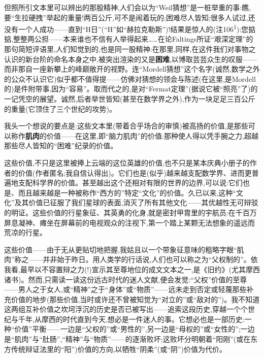 \dmark{}但照所引文本里可以辨出的那股精神,人们会以为“Weil猜想”是一桩举重的事:瞧,要“生拉硬拽”举起的重量!两百公斤,可不是闹着玩的;困难尽人皆知;很多人试过,还没有一个人成功——直到“H日”(“H”如“赫拉克勒斯”)!结果是惊人的(注106\textsuperscript{1}):您掂掂,整整两公担——本来谁也不信有人举得起来……在论Faltings所证“艰深定理”的那句简短评语里,人们知觉到的,也是同一股精神:在那里,同样,在这件我们对事物之认识的新台阶的命名本身之中,被突出渲染的又是\textbf{困难},以博取芸芸众生的叹服——而非那自一座新攀上的峰巅敞开的视野。连“Mordell猜想”这个名字(诚然,数学之外的公众不认识它)似乎都不值得提——仿佛对猜想的领会与陈述(在这里,是Mordell的)是件附带事,因为“容易”。取而代之的,是对“Fermat定理”(据说它被“照亮”了)的一记凭空的展望。诚然,后者举世皆知(甚至在数学界之外),作为一块足足三百公斤的重量(它顶住了三个世纪的攻势)。

我头一个想说的要点是:这些文本里(带着合乎场合的审慎)被高扬的价值,是那些可以称作\textbf{肌肉}的价值——在这里,即“脑力肌肉”的价值:那种使人得以凭手腕之力,超越那些尽人皆知的“困难”纪录的价值。

这些价值,不只是这里被捧上云端的这位英雄的价值,也不只是某本庆典小册子的作者的价值(作者匿名;我自信认得出)。它们也是(似乎)越来越支配数学界、进而更普遍地支配科学界的价值。甚至越出这个还相对有限的世界的边界\dmark{},可以说:它们也是、而且越来越是一种被称作“西方的”特定“文化”的价值。久已以来,这种“文化”及其价值已征服了我们星球的表面,消灭了所有其他文化——其优越性无可辩驳的明证。这些价值的行星象征、其英勇的化身,就是密封甲胄里的宇航员:在千百万屏息凝神、瘫坐在屏幕前的电视观众的注视下,第一个踏上某颗无法想象的遥远而荒凉的行星。

这些价值——由于无从更贴切地把握,我姑且以一个带象征意味的粗略字眼“肌肉”称之——并非始于昨日。用人类学的行话说,人们也可以称之为“父权制的”。依我看,最早以不容置辩之力(!)宣示其至尊地位的成文文本之一,是《旧约》(尤其摩西诸书)。然而,只需读一读这份远古时代的迷人文献,便会发觉:“父权”价值的至尊——男人之于女人,或“精神”之于“身体”或“物质”——远未走到否定或轻蔑那些补充价值的地步(那些价值,当时或许还不曾被知觉为“对立的”或“敌对的”)。我不知道这两组互补价值之坎坷浮沉的历史是否已被写出——追索这段历史,穿越一个个世纪与千年,从摩西的时代直到今天,想必是一件迷人的事。它想必也是一部历史:一种“价值”平衡——一边是“父权的”或“男性的”,另一边是“母权的”或“女性的”;一边是“肌肉”与“肚肠”,“精神”与“物质”——的逐渐败坏;这败坏分明朝着“阳刚”(或在东方传统辩证法里的“阳”)价值的方向,以牺牲“阴柔”(或“阴”)价值为代价。

